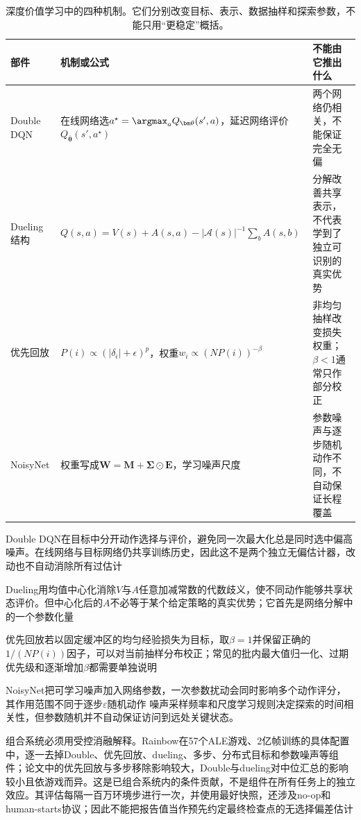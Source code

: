 \begin{table}[t]
  \centering
  \small
  \begin{tabularx}{\linewidth}{>{\raggedright\arraybackslash}p{26mm} >{\raggedright\arraybackslash}X >{\raggedright\arraybackslash}X}
    \toprule
    部件 & 机制或公式 & 不能由它推出什么 \\
    \midrule
    Double DQN & 在线网络选$a^\star=\argmax_aQ_{\bm\theta}(s',a)$，延迟网络评价$Q_{\bar{\bm\theta}}(s',a^\star)$ & 两个网络仍相关，不能保证完全无偏 \\
    Dueling结构 & $Q(s,a)=V(s)+A(s,a)-|\mathcal A(s)|^{-1}\sum_bA(s,b)$ & 分解改善共享表示，不代表学到了独立可识别的真实优势 \\
    优先回放 & $P(i)\propto(|\delta_i|+\epsilon)^p$，权重$w_i\propto(NP(i))^{-\beta}$ & 非均匀抽样改变损失权重；$\beta<1$通常只作部分校正 \\
    NoisyNet & 权重写成$\bm W=\bm M+\bm\Sigma\odot\bm E$，学习噪声尺度 & 参数噪声与逐步随机动作不同，不自动保证长程覆盖 \\
    \bottomrule
  \end{tabularx}
  \caption{深度价值学习中的四种机制。它们分别改变目标、表示、数据抽样和探索参数，不能只用“更稳定”概括。}
  \label{tab:rl-learning-dqn-components}
\end{table}

Double DQN在目标中分开动作选择与评价，避免同一次最大化总是同时选中偏高噪声。在线网络与目标网络仍共享训练历史，因此这不是两个独立无偏估计器，改动也不自动消除所有过估计

Dueling用均值中心化消除$V$与$A$任意加减常数的代数歧义，使不同动作能够共享状态评价。但中心化后的$A$不必等于某个给定策略的真实优势；它首先是网络分解中的一个参数化量

优先回放若以固定缓冲区的均匀经验损失为目标，取$\beta=1$并保留正确的$1/(NP(i))$因子，可以对当前抽样分布校正；常见的批内最大值归一化、过期优先级和逐渐增加$\beta$都需要单独说明

NoisyNet把可学习噪声加入网络参数，一次参数扰动会同时影响多个动作评分，其作用范围不同于逐步$\varepsilon$随机动作
噪声采样频率和尺度学习规则决定探索的时间相关性，但参数随机并不自动保证访问到远处关键状态。

组合系统必须用受控消融解释。Rainbow在57个ALE游戏、2亿帧训练的具体配置中，逐一去掉Double、优先回放、dueling、多步、分布式目标和参数噪声等组件；论文中的优先回放与多步移除影响较大，Double与dueling对中位汇总的影响较小且依游戏而异。这是已组合系统内的条件贡献，不是组件在所有任务上的独立效应。其评估每隔一百万环境步进行一次，并使用最好快照，还涉及no-op和human-starts协议；因此不能把报告值当作预先约定最终检查点的无选择偏差估计

